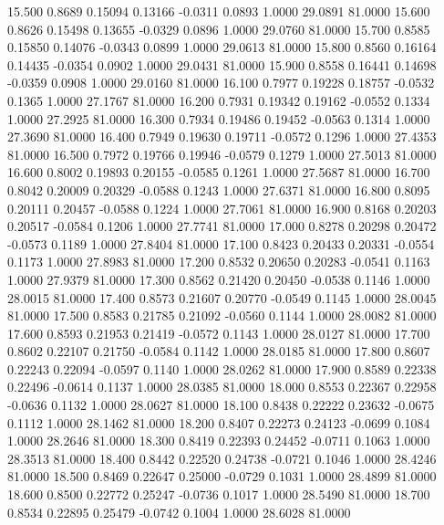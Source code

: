   15.500   0.8689   0.15094   0.13166  -0.0311   0.0893   1.0000  29.0891  81.0000
  15.600   0.8626   0.15498   0.13655  -0.0329   0.0896   1.0000  29.0760  81.0000
  15.700   0.8585   0.15850   0.14076  -0.0343   0.0899   1.0000  29.0613  81.0000
  15.800   0.8560   0.16164   0.14435  -0.0354   0.0902   1.0000  29.0431  81.0000
  15.900   0.8558   0.16441   0.14698  -0.0359   0.0908   1.0000  29.0160  81.0000
  16.100   0.7977   0.19228   0.18757  -0.0532   0.1365   1.0000  27.1767  81.0000
  16.200   0.7931   0.19342   0.19162  -0.0552   0.1334   1.0000  27.2925  81.0000
  16.300   0.7934   0.19486   0.19452  -0.0563   0.1314   1.0000  27.3690  81.0000
  16.400   0.7949   0.19630   0.19711  -0.0572   0.1296   1.0000  27.4353  81.0000
  16.500   0.7972   0.19766   0.19946  -0.0579   0.1279   1.0000  27.5013  81.0000
  16.600   0.8002   0.19893   0.20155  -0.0585   0.1261   1.0000  27.5687  81.0000
  16.700   0.8042   0.20009   0.20329  -0.0588   0.1243   1.0000  27.6371  81.0000
  16.800   0.8095   0.20111   0.20457  -0.0588   0.1224   1.0000  27.7061  81.0000
  16.900   0.8168   0.20203   0.20517  -0.0584   0.1206   1.0000  27.7741  81.0000
  17.000   0.8278   0.20298   0.20472  -0.0573   0.1189   1.0000  27.8404  81.0000
  17.100   0.8423   0.20433   0.20331  -0.0554   0.1173   1.0000  27.8983  81.0000
  17.200   0.8532   0.20650   0.20283  -0.0541   0.1163   1.0000  27.9379  81.0000
  17.300   0.8562   0.21420   0.20450  -0.0538   0.1146   1.0000  28.0015  81.0000
  17.400   0.8573   0.21607   0.20770  -0.0549   0.1145   1.0000  28.0045  81.0000
  17.500   0.8583   0.21785   0.21092  -0.0560   0.1144   1.0000  28.0082  81.0000
  17.600   0.8593   0.21953   0.21419  -0.0572   0.1143   1.0000  28.0127  81.0000
  17.700   0.8602   0.22107   0.21750  -0.0584   0.1142   1.0000  28.0185  81.0000
  17.800   0.8607   0.22243   0.22094  -0.0597   0.1140   1.0000  28.0262  81.0000
  17.900   0.8589   0.22338   0.22496  -0.0614   0.1137   1.0000  28.0385  81.0000
  18.000   0.8553   0.22367   0.22958  -0.0636   0.1132   1.0000  28.0627  81.0000
  18.100   0.8438   0.22222   0.23632  -0.0675   0.1112   1.0000  28.1462  81.0000
  18.200   0.8407   0.22273   0.24123  -0.0699   0.1084   1.0000  28.2646  81.0000
  18.300   0.8419   0.22393   0.24452  -0.0711   0.1063   1.0000  28.3513  81.0000
  18.400   0.8442   0.22520   0.24738  -0.0721   0.1046   1.0000  28.4246  81.0000
  18.500   0.8469   0.22647   0.25000  -0.0729   0.1031   1.0000  28.4899  81.0000
  18.600   0.8500   0.22772   0.25247  -0.0736   0.1017   1.0000  28.5490  81.0000
  18.700   0.8534   0.22895   0.25479  -0.0742   0.1004   1.0000  28.6028  81.0000
